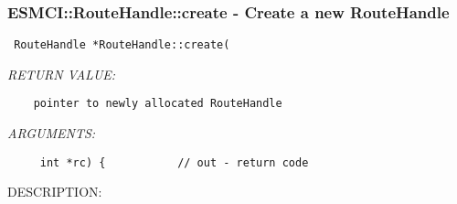  
\setlength{\oldparskip}{\parskip}
\setlength{\parskip}{1.5ex}
\setlength{\oldparindent}{\parindent}
\setlength{\parindent}{0pt}
\setlength{\oldbaselineskip}{\baselineskip}
\setlength{\baselineskip}{11pt}
 
\def\bv{\begin{verbatim}}
\def\ev{\end{verbatim}}
\def\be{\begin{equation}}
\def\ee{\end{equation}}
\def\bea{\begin{eqnarray}}
\def\eea{\end{eqnarray}}
\def\bi{\begin{itemize}}
\def\ei{\end{itemize}}
\def\bn{\begin{enumerate}}
\def\en{\end{enumerate}}
\def\bd{\begin{description}}
\def\ed{\end{description}}
\def\({\left (}
\def\){\right )}
\def\[{\left [}
\def\]{\right ]}
\def\<{\left  \langle}
\def\>{\right \rangle}
\def\cI{{\cal I}}
\def\diag{\mathop{\rm diag}}
\def\tr{\mathop{\rm tr}}


 
\subsubsection [ESMCI::RouteHandle::create] {ESMCI::RouteHandle::create - Create a new RouteHandle}


  
\begin{verbatim} RouteHandle *RouteHandle::create(\end{verbatim}{\em RETURN VALUE:}
\begin{verbatim}    pointer to newly allocated RouteHandle\end{verbatim}{\em ARGUMENTS:}
\begin{verbatim}     int *rc) {           // out - return code\end{verbatim}
{\sf DESCRIPTION:\\ }


